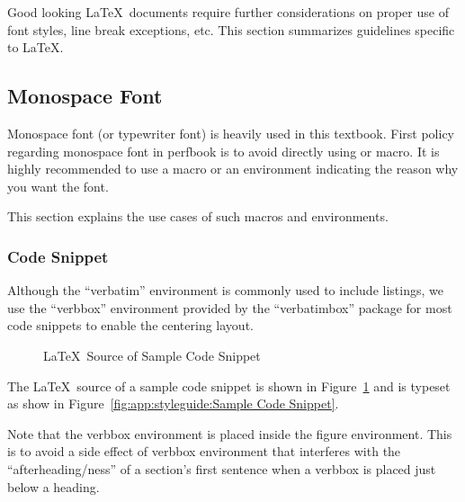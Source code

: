 Good looking \LaTeX\ documents require further considerations
on proper use of font styles, line break exceptions, etc.
This section summarizes guidelines specific to \LaTeX.

\subsection{Monospace Font}
\label{sec:app:styleguide:Monospace Font}

Monospace font (or typewriter font) is heavily used in this textbook.
First policy regarding monospace font in perfbook is to avoid
directly using \qco{\\texttt} or \qco{\\tt} macro.
It is highly recommended to use a macro or an environment
indicating the reason why you want the font.

This section explains the use cases of such macros and environments.

\subsubsection{Code Snippet}
\label{sec:app:styleguide:Code Snippet}

Although the ``verbatim'' environment is commonly used to include
listings, we use the ``verbbox'' environment provided by the
``verbatimbox'' package for most code snippets to enable the
centering layout.


\begin{figure}[tbh]
{ \scriptsize
{}
}
\centering
\theverbbox
\caption{\LaTeX\ Source of Sample Code Snippet}
\label{fig:app:styleguide:LaTeX Source of Sample Code Snippet}
\end{figure}



The \LaTeX\ source of a sample code snippet is shown in
Figure~\ref{fig:app:styleguide:LaTeX Source of Sample Code Snippet}
and is typeset as show in
Figure~\ref{fig:app:styleguide:Sample Code Snippet}.

Note that the verbbox environment is placed inside the figure environment.
This is to avoid a side effect of verbbox environment that interferes
with the ``afterheading\-/ness'' of a section's first sentence
when a verbbox is placed just below a heading.

